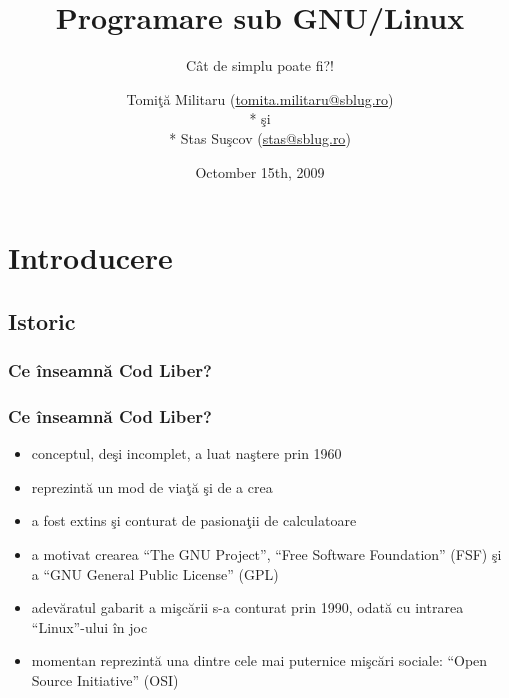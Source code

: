 \documentclass[compress]{beamer}
\title{Programare sub GNU/Linux}
\subtitle{C\^{a}t de simplu poate fi?!}
\author{Tomi\c{t}\u{a} Militaru (\href{mailto:tomita.militaru@sblug.ro}{tomita.militaru@sblug.ro})
\\* \c{s}i
\\* Stas Su\c{s}cov (\href{mailto:stas@sblug.ro}{stas@sblug.ro})}
\date{Octomber 15th, 2009}
\begin{document}
\maketitle


\section{Introducere}
\subsection{Istoric}


\begin{frame}
\frametitle{Ce \^{i}nseamn\u{a} Cod Liber?}
\end{frame}


\begin{frame}
\frametitle{Ce \^{i}nseamn\u{a} Cod Liber?}

\begin{itemize}
    \item<1-> conceptul, de\c{s}i incomplet, a luat na\c{s}tere prin 1960
    \item<2-> reprezint\u{a} un mod de via\c{t}\u{a} \c{s}i de a crea
    \item<3-> a fost extins \c{s}i conturat de pasiona\c{t}ii de calculatoare
    \item<4-> a motivat crearea “The GNU Project”, “Free Software Foundation” (FSF) \c{s}i a “GNU General Public License” (GPL)
    \item<5-> adev\u{a}ratul gabarit a mi\c{s}c\u{a}rii s-a conturat prin 1990, odat\u{a} cu intrarea “Linux”-ului \^{i}n joc
    \item<6-> momentan reprezint\u{a} una dintre cele mai puternice mi\c{s}c\u{a}ri sociale: “Open Source Initiative” (OSI)
\end{itemize}

\end{frame}
\end{document}
